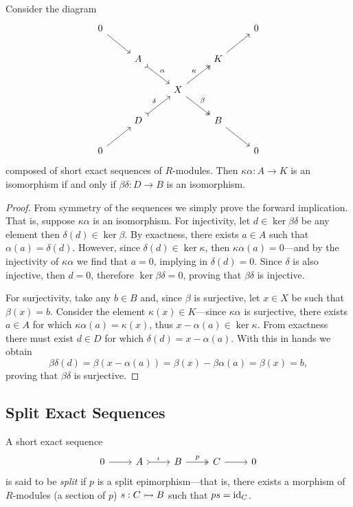 \begin{lemma}
\label{lemma:big-X-of-short-exact-seq-iso-iff-iso}
Consider the diagram
\[
\begin{tikzcd}
0 \ar[rd] & & & &0
\\
&A \ar[rd, tail, "\alpha"] & &K \ar[ru] &
\\
& &X \ar[ru, two heads, "\kappa"] \ar[dr, two heads, "\beta"] & &
\\
&D \ar[ru, tail, "\delta"] & &B \ar[rd] &
\\
0 \ar[ru] & & & &0
\end{tikzcd}
\]
composed of short exact sequences of \(R\)-modules. Then
\(\kappa \alpha: A \to K\) is an isomorphism if and only if
\(\beta \delta: D \to B\) is an isomorphism.
\end{lemma}

\begin{proof}
From symmetry of the sequences we simply prove the forward implication. That is,
suppose \(\kappa \alpha\) is an isomorphism. For injectivity, let
\(d \in \ker \beta \delta\) be any element then \(\delta(d) \in \ker \beta\). By
exactness, there exists \(a \in A\) such that \(\alpha(a) =
\delta(d)\). However, since \(\delta(d) \in \ker \kappa\), then
\(\kappa \alpha(a) = 0\)---and by the injectivity of \(\kappa \alpha\) we find
that \(a = 0\), implying in \(\delta(d) = 0\). Since \(\delta\) is also
injective, then \(d = 0\), therefore \(\ker \beta \delta = 0\), proving that
\(\beta \delta\) is injective.

For surjectivity, take any \(b \in B\) and, since \(\beta\) is surjective, let
\(x \in X\) be such that \(\beta(x) = b\). Consider the element
\(\kappa(x) \in K\)---since \(\kappa \alpha\) is surjective, there exists
\(a \in A\) for which \(\kappa \alpha(a) = \kappa(x)\), thus
\(x - \alpha(a) \in \ker \kappa\). From exactness there must exist \(d \in D\)
for which \(\delta(d) = x - \alpha(a)\). With this in hands we obtain
\[
\beta \delta(d)
= \beta(x - \alpha(a))
= \beta(x) - \beta \alpha(a)
= \beta(x)
= b,
\]
proving that \(\beta \delta\) is surjective.
\end{proof}

\subsection{Split Exact Sequences}

\begin{definition}
\label{def:split-short-exact-sequence}
A short exact sequence
\[
\begin{tikzcd}
0 \ar[r] &A \ar[r, tail, "\iota"] &B \ar[r, two heads, "p"] &C \ar[r] &0
\end{tikzcd}
\]
is said to be \emph{split} if \(p\) is a split epimorphism---that is, there
exists a morphism of \(R\)-modules (a section of \(p\)) \(s: C \rightarrowtail B\) such
that \(p s = \operatorname{id}_C\).
\end{definition}

